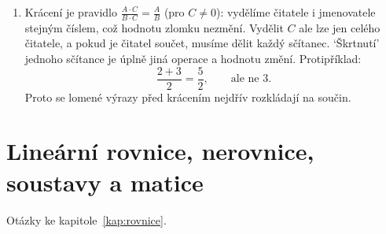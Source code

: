 \begin{enumerate}[label=\textbf{\arabic*.}, leftmargin=*, itemsep=0.8em]
  \item {}
  Krácení je pravidlo $\frac{A\cdot C}{B\cdot C} = \frac{A}{B}$ (pro $C\neq 0$): vydělíme čitatele i jmenovatele stejným číslem, což hodnotu zlomku nezmění. Vydělit $C$ ale lze jen celého čitatele, a pokud je čitatel součet, musíme dělit každý sčítanec. `Škrtnutí' jednoho sčítance je úplně jiná operace a hodnotu změní. Protipříklad:
  \begin{equation*}
    \frac{2 + 3}{2} = \frac{5}{2}, \qquad\text{ale ne } 3.
  \end{equation*}
  Proto se lomené výrazy před krácením nejdřív rozkládají na součin. 
\end{enumerate}

\section{Lineární rovnice, nerovnice, soustavy a matice}

Otázky ke kapitole~\ref{kap:rovnice}.

